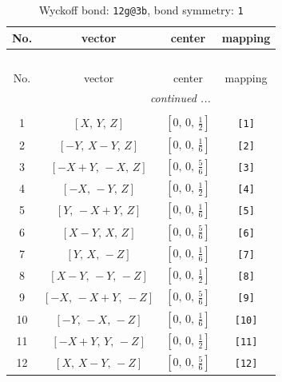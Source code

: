 \documentclass[fleqn,8pt]{jsarticle}
\begin{document}
\begin{longtable}{cccc}
\caption{Wyckoff bond: {\tt 12g@3b}, bond symmetry: {\tt 1}}
 \\
 \hline \hline
No. & vector & center & mapping \\ \hline \endfirsthead

\multicolumn{3}{l}{\tablename\ \thetable{}} \\
 \hline \hline
No. & vector & center & mapping \\ \hline \endhead

 \hline \hline
\multicolumn{3}{r}{\footnotesize\it continued ...} \\ \endfoot

 \hline \hline
\multicolumn{3}{r}{} \\ \endlastfoot

1 & $\left[ X,\, Y,\, Z \right]$ & $\left[ 0,\, 0,\, \frac{1}{2} \right]$ & {\tt [1]} \\ \hline
2 & $\left[ - Y,\, X - Y,\, Z \right]$ & $\left[ 0,\, 0,\, \frac{1}{6} \right]$ & {\tt [2]} \\ \hline
3 & $\left[ - X + Y,\, - X,\, Z \right]$ & $\left[ 0,\, 0,\, \frac{5}{6} \right]$ & {\tt [3]} \\ \hline
4 & $\left[ - X,\, - Y,\, Z \right]$ & $\left[ 0,\, 0,\, \frac{1}{2} \right]$ & {\tt [4]} \\ \hline
5 & $\left[ Y,\, - X + Y,\, Z \right]$ & $\left[ 0,\, 0,\, \frac{1}{6} \right]$ & {\tt [5]} \\ \hline
6 & $\left[ X - Y,\, X,\, Z \right]$ & $\left[ 0,\, 0,\, \frac{5}{6} \right]$ & {\tt [6]} \\ \hline
7 & $\left[ Y,\, X,\, - Z \right]$ & $\left[ 0,\, 0,\, \frac{1}{6} \right]$ & {\tt [7]} \\ \hline
8 & $\left[ X - Y,\, - Y,\, - Z \right]$ & $\left[ 0,\, 0,\, \frac{1}{2} \right]$ & {\tt [8]} \\ \hline
9 & $\left[ - X,\, - X + Y,\, - Z \right]$ & $\left[ 0,\, 0,\, \frac{5}{6} \right]$ & {\tt [9]} \\ \hline
10 & $\left[ - Y,\, - X,\, - Z \right]$ & $\left[ 0,\, 0,\, \frac{1}{6} \right]$ & {\tt [10]} \\ \hline
11 & $\left[ - X + Y,\, Y,\, - Z \right]$ & $\left[ 0,\, 0,\, \frac{1}{2} \right]$ & {\tt [11]} \\ \hline
12 & $\left[ X,\, X - Y,\, - Z \right]$ & $\left[ 0,\, 0,\, \frac{5}{6} \right]$ & {\tt [12]} \\
\end{longtable}
\end{document}
